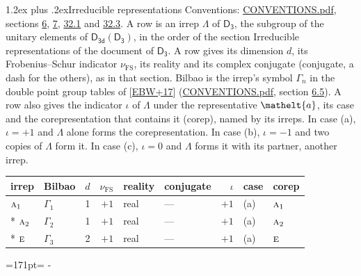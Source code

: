 \documentclass[10pt,a4paper]{article}
\makeatletter
\renewcommand\section{\@startsection{section}{1}{\z@}{-3ex plus -1ex minus -.2ex}%
  {1.2ex plus .2ex}{\normalfont\large\sffamily\bfseries\color{parttitle}}}
\newcommand{\needspace}[1]{\par\penalty-100\begingroup\dimen0=#1\relax\dimen2=\pagegoal
  \advance\dimen2-\pagetotal\ifdim\dimen0>\dimen2\relax\ifdim\dimen2>0pt\vfil\break\fi\fi
  \endgroup}
\numberwithin{equation}{section}
\newcommand{\eltfont}[1]{{\let\sigma\eltsigma\mathelt{#1}}}
\newcommand{\grp}[1]{\mathsf{#1}}
\newcommand{\irr}[1]{\text{\normalfont\scshape #1}}
\newcommand{\elt}[1]{\eltfont{#1}}
\newcommand{\fsind}{\nu_{\mathrm{FS}}}
\makeatother
\begin{document}
\section{Irreducible representations}\label{s:irreps}
Conventions: \href{../../CONVENTIONS.pdf}{CONVENTIONS.pdf}, sections \href{../../../rotation/CONVENTIONS.pdf\#conv.6}{6}, \href{../../../rotation/CONVENTIONS.pdf\#conv.7}{7}, \href{../../CONVENTIONS.pdf\#conv.32.1}{32.1} and \href{../../CONVENTIONS.pdf\#conv.32.3}{32.3}.
\leavevmode\label{n:irrep.Delta}A row is an irrep $\Lambda$ of $\grp{D_{3}}$, the subgroup of the unitary elements of $\grp{D_{3d}}(\grp{D_{3}})$, in the order of the section Irreducible representations of the document of \href{../../../rotation/data/pdf/D3.pdf}{$\grp{D_{3}}$}. \label{n:index.dimension}\label{n:index.frobenius}\label{n:head.irrep}\label{n:head.reality}\label{n:head.conjugate}A row gives its dimension $d$, its Frobenius--Schur indicator $\fsind$, its reality and its complex conjugate (conjugate, a dash for the others), as in that section. \label{n:head.bilbao}\label{n:irrep.alias.gamma}Bilbao is the irrep's symbol $\Gamma_n$ in the double point group tables of [\href{../../../REFERENCES.pdf\#ref.EBW+17}{EBW+17}] (\href{../../CONVENTIONS.pdf}{CONVENTIONS.pdf}, section \href{../../../rotation/CONVENTIONS.pdf\#conv.6.5}{6.5}). \label{n:head.case.corep}\label{n:head.corep}A row also gives the indicator $\iota$ of $\Lambda$ under the representative $\elt{a}$, its case and the corepresentation that contains it (corep), named by its irreps. In case (a), $\iota = +1$ and $\Lambda$ alone forms the corepresentation. In case (b), $\iota = -1$ and two copies of $\Lambda$ form it. In case (c), $\iota = 0$ and $\Lambda$ forms it with its partner, another irrep.
\setlength{\emergencystretch}{2em}\par\setlength{\emergencystretch}{0pt}
{\small\renewcommand{\arraystretch}{1.25}\setlength{\tabcolsep}{4pt}\begin{longtable}{@{}llrrllrll@{}}\toprule
irrep & Bilbao & $d$ & $\fsind$ & reality & conjugate & $\iota$ & case & corep\\\midrule\endhead
\bottomrule\endfoot\endlastfoot
$\irr{a}_{1}$ & $\Gamma_{1}$ & 1 & $+1$ & real & --- & $+1$ & (a) & $\irr{a}_{1}$\\*
$\irr{a}_{2}$ & $\Gamma_{2}$ & 1 & $+1$ & real & --- & $+1$ & (a) & $\irr{a}_{2}$\\*
$\irr{e}$ & $\Gamma_{3}$ & 2 & $+1$ & real & --- & $+1$ & (a) & $\irr{e}$\\
\bottomrule\end{longtable}}
\needspace{171pt}
\end{document}
